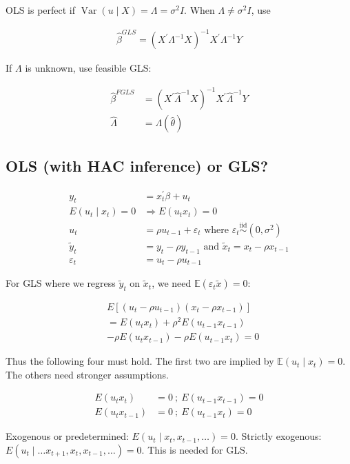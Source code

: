 OLS is perfect if $\operatorname{Var}(u \mid X)=\Lambda=\sigma^2 I$. When $\Lambda \neq \sigma^2 I$, use

\begin{align*}
    \hat{\beta}^{G L S}=\left(X^{\prime} \Lambda^{-1} X\right)^{-1} X^{\prime} \Lambda^{-1} Y
\end{align*}

If $\Lambda$ is unknown, use feasible GLS:

\begin{align*}
    \hat{\beta}^{F G L S}&=\left(X^{\prime} \hat{\Lambda}^{-1} X\right)^{-1} X^{\prime} \hat{\Lambda}^{-1} Y \\
    \hat{\Lambda}&=\Lambda(\hat{\theta})
\end{align*}

\subsection{OLS (with HAC inference) or GLS?}

\begin{align*}
    y_t&=x_t^{\prime} \beta+u_t \\
    E\left(u_t \mid x_t\right)=0 &\Rightarrow E\left(u_t x_t\right)=0 \\
    u_t&=\rho u_{t-1}+\varepsilon_t \text { where } \varepsilon_t \stackrel{\text{iid}}{\sim} \left(0, \sigma^2\right) \\
    \widetilde{y}_t&=y_t-\rho y_{t-1} \text{ and } \widetilde{x}_t=x_t-\rho x_{t-1} \\
    \varepsilon_t&=u_t-\rho u_{t-1}
\end{align*}

For GLS where we regress $\widetilde{y}_t$ on $\widetilde{x}_t$, we need $\mathbb{E}\left(\varepsilon_t \widetilde{x}\right)=0$:

\begin{align*}
    &E\left[\left(u_t-\rho u_{t-1}\right)\left(x_t-\rho x_{t-1}\right)\right] \\
    &=E\left(u_t x_t\right)+\rho^2 E\left(u_{t-1} x_{t-1}\right) \\
    &-\rho E\left(u_t x_{t-1}\right)-\rho E\left(u_{t-1} x_t\right) =0 
\end{align*}

Thus the following four must hold. The first two are implied by $\mathbb{E}(u_t \mid x_t)=0$. The others need stronger assumptions.

\begin{align*}
    E\left(u_t x_t\right) & =0 \: ; \:
    E\left(u_{t-1} x_{t-1}\right) =0 \\
    E\left(u_t x_{t-1}\right) & =0 \: ; \:
    E\left(u_{t-1} x_t\right) =0
\end{align*}

Exogenous or predetermined: $E\left(u_t \mid x_t, x_{t-1}, \ldots\right)=0$.
Strictly exogenous: $E\left(u_t \mid \ldots x_{t+1}, x_t, x_{t-1}, \ldots\right)=0$. This is needed for GLS.